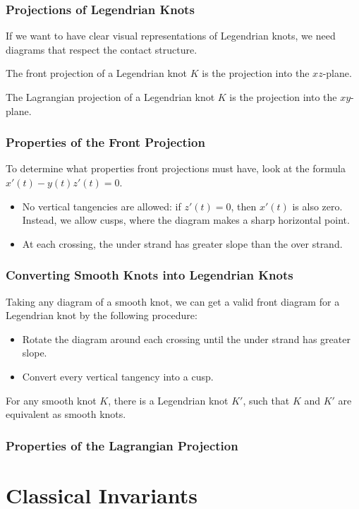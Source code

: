 \documentclass{beamer}
\begin{document}
\begin{frame}
    \frametitle{Projections of Legendrian Knots}
    If we want to have clear visual representations of Legendrian knots,
    we need diagrams that respect the contact structure.

    \begin{definition}
    The \alert{front projection} of a Legendrian knot $K$ is the projection
    into the $xz$-plane.
    \end{definition}

    \begin{definition}
    The \alert{Lagrangian projection} of a Legendrian knot $K$ is the projection
    into the $xy$-plane.
    \end{definition}
\end{frame}

\begin{frame}
    \frametitle{Properties of the Front Projection}
    To determine what properties front projections must have, look at the
    formula $x'(t) - y(t)z'(t) = 0$.
    \begin{itemize}
    \item No vertical tangencies are allowed: if $z'(t) = 0$, then $x'(t)$ is also zero.
    Instead, we allow \alert{cusps}, where the diagram makes a sharp horizontal point.
    \item At each crossing, the under strand has greater slope than the over strand.
    \end{itemize}
\end{frame}

\begin{frame}
    \frametitle{Converting Smooth Knots into Legendrian Knots}
    Taking any diagram of a smooth knot, we can get a valid front diagram for a Legendrian
    knot by the following procedure:
    \begin{itemize}
    \item Rotate the diagram around each crossing until the under strand has greater slope.
    \item Convert every vertical tangency into a cusp.
    \end{itemize}
    \begin{theorem}
        For any smooth knot $K$, there is a Legendrian knot $K'$, such that $K$ and $K'$ are
        equivalent as smooth knots.
    \end{theorem}
\end{frame}

\begin{frame}
\frametitle{Properties of the Lagrangian Projection}
\end{frame}

\section{Classical Invariants}
\end{document}
